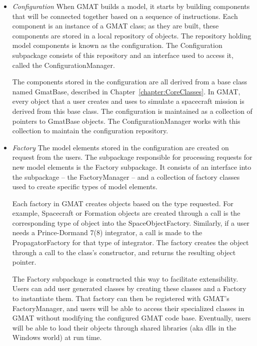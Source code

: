 \begin{description}
\begin{itemize}
    \item \textit{Configuration} When GMAT builds a model, it starts
by building components that will be connected together based on a sequence of instructions.  Each
component is an instance of a GMAT class; as they are built, these components are stored in a local
repository of objects. The repository holding model components is known as the configuration.  The
Configuration subpackage consists of this repository and an interface used to access it, called the
ConfigurationManager.

    The components stored in the configuration are all derived from a base class named GmatBase,
described in Chapter~\ref{chapter:CoreClasses}.  In GMAT, every object that a user creates and uses
to simulate a spacecraft mission is derived from this base class.  The configuration is maintained
as a collection of pointers to GmatBase objects.  The ConfigurationManager works with this
collection to maintain the configuration repository.

    \item \textit{Factory} The model elements stored
in the configuration are created on request from the users.  The subpackage responsible for
processing requests for new model elements is the Factory subpackage.  It consists of an interface
into the subpackage -- the FactoryManager -- and a collection of factory classes used to create
specific types of model elements.

    Each factory in GMAT creates objects based on the type requested.  For example, Spacecraft or
Formation objects are created through a call is the corresponding type of object into the
SpaceObjectFactory.  Similarly, if a user needs a Prince-Dormand 7(8) integrator, a call is made to
the PropagatorFactory for that type of integrator.  The factory creates the object through a call to
the class's constructor, and returns the resulting object pointer.

    The Factory subpackage is constructed this way to facilitate extensibility.  Users can add user
generated classes by creating these classes and a Factory to instantiate them.  That factory can
then be registered with GMAT's FactoryManager, and users will be able to access their specialized
classes in GMAT without modifying the configured GMAT code base.  Eventually, users will be able to
load their objects through shared libraries (aka dlls in the Windows world) at run time.


\end{itemize}
\end{description}
